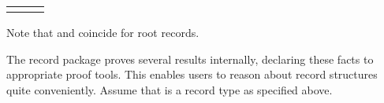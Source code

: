 \begin{isabellebody}
\begin{isamarkuptext}
\begin{tabular}{lll}
    \isa{{\isaliteral{22}{\isachardoublequote}}t{\isaliteral{2E}{\isachardot}}truncate{\isaliteral{22}{\isachardoublequote}}} & \isa{{\isaliteral{22}{\isachardoublequote}}{\isaliteral{3A}{\isacharcolon}}{\isaliteral{3A}{\isacharcolon}}{\isaliteral{22}{\isachardoublequote}}} & \isa{{\isaliteral{22}{\isachardoublequote}}{\isaliteral{5C3C6C706172723E}{\isasymlparr}}\isaliteral{5C3C5E7665633E}{}\isactrlvec b\ {\isaliteral{3A}{\isacharcolon}}{\isaliteral{3A}{\isacharcolon}}\ \isaliteral{5C3C5E7665633E}{}\isactrlvec {\isaliteral{5C3C72686F3E}{\isasymrho}}{\isaliteral{2C}{\isacharcomma}}\ \isaliteral{5C3C5E7665633E}{}\isactrlvec c\ {\isaliteral{3A}{\isacharcolon}}{\isaliteral{3A}{\isacharcolon}}\ \isaliteral{5C3C5E7665633E}{}\isactrlvec {\isaliteral{5C3C7369676D613E}{\isasymsigma}}{\isaliteral{2C}{\isacharcomma}}\ {\isaliteral{5C3C646F74733E}{\isasymdots}}\ {\isaliteral{3A}{\isacharcolon}}{\isaliteral{3A}{\isacharcolon}}\ {\isaliteral{5C3C7A6574613E}{\isasymzeta}}{\isaliteral{5C3C72706172723E}{\isasymrparr}}\ {\isaliteral{5C3C52696768746172726F773E}{\isasymRightarrow}}\ {\isaliteral{5C3C6C706172723E}{\isasymlparr}}\isaliteral{5C3C5E7665633E}{}\isactrlvec b\ {\isaliteral{3A}{\isacharcolon}}{\isaliteral{3A}{\isacharcolon}}\ \isaliteral{5C3C5E7665633E}{}\isactrlvec {\isaliteral{5C3C72686F3E}{\isasymrho}}{\isaliteral{2C}{\isacharcomma}}\ \isaliteral{5C3C5E7665633E}{}\isactrlvec c\ {\isaliteral{3A}{\isacharcolon}}{\isaliteral{3A}{\isacharcolon}}\ \isaliteral{5C3C5E7665633E}{}\isactrlvec {\isaliteral{5C3C7369676D613E}{\isasymsigma}}{\isaliteral{5C3C72706172723E}{\isasymrparr}}{\isaliteral{22}{\isachardoublequote}}} \\
  \end{tabular}
  \medskip

  \noindent Note that  and  coincide
  for root records.%
\end{isamarkuptext}%
\isamarkuptrue%
%
\isamarkuptrue%
%
\begin{isamarkuptext}%
The record package proves several results internally, declaring
  these facts to appropriate proof tools.  This enables users to
  reason about record structures quite conveniently.  Assume that
   is a record type as specified above.

  \begin{enumerate}


\end{enumerate}
\end{isamarkuptext}
\end{isabellebody}
